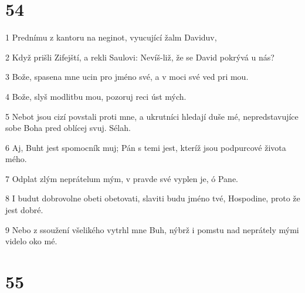 \chapter{54}

\par 1 Prednímu z kantoru na neginot, vyucující žalm Daviduv,
\par 2 Když prišli Zifejští, a rekli Saulovi: Nevíš-liž, že se David pokrývá u nás?
\par 3 Bože, spasena mne ucin pro jméno své, a v moci své ved pri mou.
\par 4 Bože, slyš modlitbu mou, pozoruj reci úst mých.
\par 5 Nebot jsou cizí povstali proti mne, a ukrutníci hledají duše mé, nepredstavujíce sobe Boha pred oblícej svuj. Sélah.
\par 6 Aj, Buht jest spomocník muj; Pán s temi jest, kteríž jsou podpurcové života mého.
\par 7 Odplat zlým neprátelum mým, v pravde své vyplen je, ó Pane.
\par 8 I budut dobrovolne obeti obetovati, slaviti budu jméno tvé, Hospodine, proto že jest dobré.
\par 9 Nebo z ssoužení všelikého vytrhl mne Buh, nýbrž i pomstu nad neprátely mými videlo oko mé.

\chapter{55}

